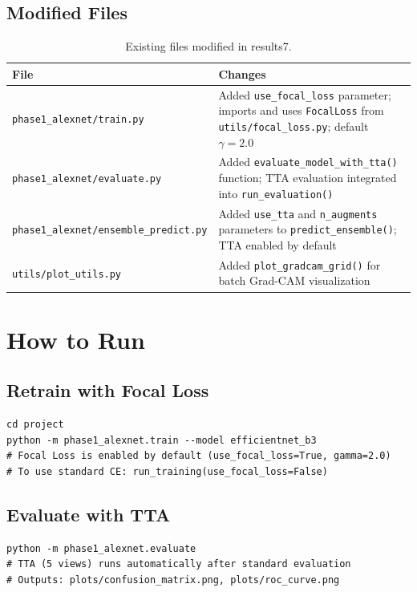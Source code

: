 \documentclass[11pt]{article}
\begin{document}
\subsection{Modified Files}

\begin{table}[H]
\centering
\renewcommand{\arraystretch}{1.2}
\begin{tabularx}{\textwidth}{lX}
\toprule
\textbf{File} & \textbf{Changes} \\
\midrule
\texttt{phase1\_alexnet/train.py} & Added \texttt{use\_focal\_loss} parameter; imports and uses \texttt{FocalLoss} from \texttt{utils/focal\_loss.py}; default $\gamma=2.0$ \\
\texttt{phase1\_alexnet/evaluate.py} & Added \texttt{evaluate\_model\_with\_tta()} function; TTA evaluation integrated into \texttt{run\_evaluation()} \\
\texttt{phase1\_alexnet/ensemble\_predict.py} & Added \texttt{use\_tta} and \texttt{n\_augments} parameters to \texttt{predict\_ensemble()}; TTA enabled by default \\
\texttt{utils/plot\_utils.py} & Added \texttt{plot\_gradcam\_grid()} for batch Grad-CAM visualization \\
\bottomrule
\end{tabularx}
\caption{Existing files modified in results7.}
\end{table}

\section{How to Run}

\subsection{Retrain with Focal Loss}
\begin{verbatim}
cd project
python -m phase1_alexnet.train --model efficientnet_b3
# Focal Loss is enabled by default (use_focal_loss=True, gamma=2.0)
# To use standard CE: run_training(use_focal_loss=False)
\end{verbatim}

\subsection{Evaluate with TTA}
\begin{verbatim}
python -m phase1_alexnet.evaluate
# TTA (5 views) runs automatically after standard evaluation
# Outputs: plots/confusion_matrix.png, plots/roc_curve.png
\end{verbatim}
\end{document}
